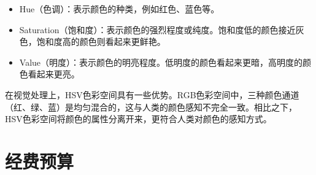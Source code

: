 \documentclass[10pt]{ctexart}
\begin{document}
\begin{itemize}
    \item Hue（色调）：表示颜色的种类，例如红色、蓝色等。
    \item Saturation（饱和度）：表示颜色的强烈程度或纯度。饱和度低的颜色接近灰色，饱和度高的颜色则看起来更鲜艳。
    \item Value（明度）：表示颜色的明亮程度。低明度的颜色看起来更暗，高明度的颜色看起来更亮。
\end{itemize}

在视觉处理上，HSV色彩空间具有一些优势。RGB色彩空间中，三种颜色通道（红、绿、蓝）是均匀混合的，这与人类的颜色感知不完全一致。相比之下，HSV色彩空间将颜色的属性分离开来，更符合人类对颜色的感知方式。



\clearpage
\section{经费预算}
\end{document}
